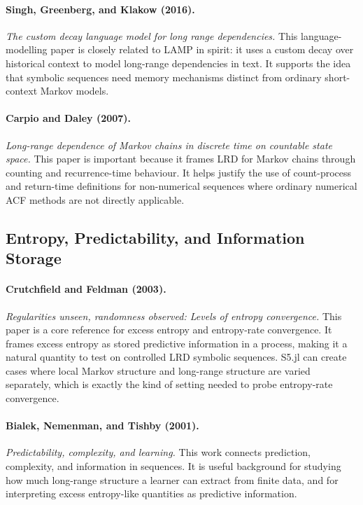 \paragraph{Singh, Greenberg, and Klakow (2016).}
\emph{The custom decay language model for long range dependencies.}
This language-modelling paper is closely related to LAMP in spirit: it uses a
custom decay over historical context to model long-range dependencies in text.
It supports the idea that symbolic sequences need memory mechanisms distinct
from ordinary short-context Markov models.

\paragraph{Carpio and Daley (2007).}
\emph{Long-range dependence of Markov chains in discrete time on countable state
space.}
This paper is important because it frames LRD for Markov chains through counting
and recurrence-time behaviour. It helps justify the use of count-process and
return-time definitions for non-numerical sequences where ordinary numerical ACF
methods are not directly applicable.

\subsection{Entropy, Predictability, and Information Storage}

\paragraph{Crutchfield and Feldman (2003).}
\emph{Regularities unseen, randomness observed: Levels of entropy convergence.}
This paper is a core reference for excess entropy and entropy-rate convergence.
It frames excess entropy as stored predictive information in a process, making it
a natural quantity to test on controlled LRD symbolic sequences. S5.jl can create
cases where local Markov structure and long-range structure are varied
separately, which is exactly the kind of setting needed to probe entropy-rate
convergence.

\paragraph{Bialek, Nemenman, and Tishby (2001).}
\emph{Predictability, complexity, and learning.}
This work connects prediction, complexity, and information in sequences. It is
useful background for studying how much long-range structure a learner can
extract from finite data, and for interpreting excess entropy-like quantities as
predictive information.

